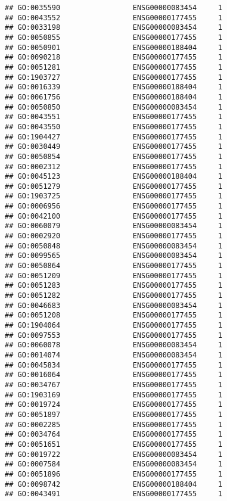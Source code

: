 \documentclass[
]{article}
\begin{document}
\begin{verbatim}
## GO:0035590                 ENSG00000083454     1
## GO:0043552                 ENSG00000177455     1
## GO:0033198                 ENSG00000083454     1
## GO:0050855                 ENSG00000177455     1
## GO:0050901                 ENSG00000188404     1
## GO:0090218                 ENSG00000177455     1
## GO:0051281                 ENSG00000177455     1
## GO:1903727                 ENSG00000177455     1
## GO:0016339                 ENSG00000188404     1
## GO:0061756                 ENSG00000188404     1
## GO:0050850                 ENSG00000083454     1
## GO:0043551                 ENSG00000177455     1
## GO:0043550                 ENSG00000177455     1
## GO:1904427                 ENSG00000177455     1
## GO:0030449                 ENSG00000177455     1
## GO:0050854                 ENSG00000177455     1
## GO:0002312                 ENSG00000177455     1
## GO:0045123                 ENSG00000188404     1
## GO:0051279                 ENSG00000177455     1
## GO:1903725                 ENSG00000177455     1
## GO:0006956                 ENSG00000177455     1
## GO:0042100                 ENSG00000177455     1
## GO:0060079                 ENSG00000083454     1
## GO:0002920                 ENSG00000177455     1
## GO:0050848                 ENSG00000083454     1
## GO:0099565                 ENSG00000083454     1
## GO:0050864                 ENSG00000177455     1
## GO:0051209                 ENSG00000177455     1
## GO:0051283                 ENSG00000177455     1
## GO:0051282                 ENSG00000177455     1
## GO:0046683                 ENSG00000083454     1
## GO:0051208                 ENSG00000177455     1
## GO:1904064                 ENSG00000177455     1
## GO:0097553                 ENSG00000177455     1
## GO:0060078                 ENSG00000083454     1
## GO:0014074                 ENSG00000083454     1
## GO:0045834                 ENSG00000177455     1
## GO:0016064                 ENSG00000177455     1
## GO:0034767                 ENSG00000177455     1
## GO:1903169                 ENSG00000177455     1
## GO:0019724                 ENSG00000177455     1
## GO:0051897                 ENSG00000177455     1
## GO:0002285                 ENSG00000177455     1
## GO:0034764                 ENSG00000177455     1
## GO:0051651                 ENSG00000177455     1
## GO:0019722                 ENSG00000083454     1
## GO:0007584                 ENSG00000083454     1
## GO:0051896                 ENSG00000177455     1
## GO:0098742                 ENSG00000188404     1
## GO:0043491                 ENSG00000177455     1

\end{verbatim}
\end{document}
